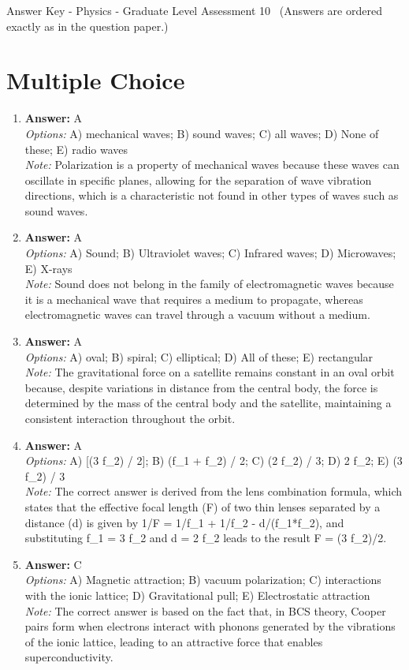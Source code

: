 \documentclass[12pt]{article}
\begin{document}
\begin{center}
Answer Key - Physics - Graduate Level Assessment 10 \
\small (Answers are ordered exactly as in the question paper.)
\end{center}

\section*{Multiple Choice}
\begin{enumerate}[label=\arabic*.]
\item \textbf{Answer:} A
\\ \textit{Options:} A) mechanical waves; B) sound waves; C) all waves; D) None of these; E) radio waves
\\ \textit{Note:} Polarization is a property of mechanical waves because these waves can oscillate in specific planes, allowing for the separation of wave vibration directions, which is a characteristic not found in other types of waves such as sound waves.
\item \textbf{Answer:} A
\\ \textit{Options:} A) Sound; B) Ultraviolet waves; C) Infrared waves; D) Microwaves; E) X-rays
\\ \textit{Note:} Sound does not belong in the family of electromagnetic waves because it is a mechanical wave that requires a medium to propagate, whereas electromagnetic waves can travel through a vacuum without a medium.
\item \textbf{Answer:} A
\\ \textit{Options:} A) oval; B) spiral; C) elliptical; D) All of these; E) rectangular
\\ \textit{Note:} The gravitational force on a satellite remains constant in an oval orbit because, despite variations in distance from the central body, the force is determined by the mass of the central body and the satellite, maintaining a consistent interaction throughout the orbit.
\item \textbf{Answer:} A
\\ \textit{Options:} A) [(3 f\_2) / 2]; B) (f\_1 + f\_2) / 2; C) (2 f\_2) / 3; D) 2 f\_2; E) (3 f\_2) / 3
\\ \textit{Note:} The correct answer is derived from the lens combination formula, which states that the effective focal length (F) of two thin lenses separated by a distance (d) is given by 1/F = 1/f\_1 + 1/f\_2 - d/(f\_1*f\_2), and substituting f\_1 = 3 f\_2 and d = 2 f\_2 leads to the result F = (3 f\_2)/2.
\item \textbf{Answer:} C
\\ \textit{Options:} A) Magnetic attraction; B) vacuum polarization; C) interactions with the ionic lattice; D) Gravitational pull; E) Electrostatic attraction
\\ \textit{Note:} The correct answer is based on the fact that, in BCS theory, Cooper pairs form when electrons interact with phonons generated by the vibrations of the ionic lattice, leading to an attractive force that enables superconductivity.
\end{enumerate}
\end{document}
